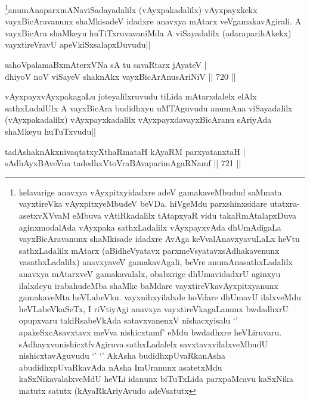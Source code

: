 \begin{artha}
\footnote{kelavarige anavxya vAyxpitxyidadxre adeV gamakaveMbudud  saMmata vayxtireVka vAyxpitxyeMbudeV beVDa. hiVgeMdu parxshinxsidare utatxra-asetxvXVvaM eMbuva vAtiRkadalilx tAtapxyaR vidu takaRmAtalapxDuva aginxmodalAda vAyxpaka sathxLadalilx vAyxpayxvAda dhUmAdigaLa vayxBicAravanunx shaMkisade idadxre AvAga keVvalAnavxyavuLaLx heVtu sathxLadalilx mAtarx (aBidheVyatavx parxmeVsyatavxsAdhakavenunx vasathxLadalilx) anavxyaveV gamakavAgali, beVre anumAnasathxLadalilx anavxya mAtarxveV gamakavalalx, obabxrige dhUmavidadxrU aginxyu ilalxdeyu irabahudeMba shaMke baMdare vayxtireVkavAyxpitxyanunx gamakaveMta heVLabeVku. vayxnihxyilalxde hoVdare dhUmavU ilalxveMdu heVLabeVkaSeTx, I riVtiyAgi anavxya vayxtireVkagaLanunx bwdadhxrU opupxvaru takiRsabeVkAda satavxvanenxV nishacxyisalu `\stext' apakeSxcAsavxtavx meVva nishicxtamf' eMdu bwdadhxre heVLiruvaru. sAdhayxvunishicxtfvAgiruva sathxLadalelx savxtavxvilalxveMbudU nishicxtavAguvudu `\stext' `\stext' AkAsha budidhxpUvaRkanAsha abudidhxpUvaRkavAda nAsha ImUranunx asatetxMdu kaSxNikavalalxveMdU heVLi idanunx biTuTxLida parxpaMcavu kaSxNika matutx satutx (kAyaRkAriyAvudo adeVsatutx}anumAnaparxmANaviSadayadalilx (vAyxpakadalilx) vAyxpayxkekx vayxBicAravanunx shaMkisadeV idadxre anavxya mAtarx veVgamakavAgirali. A vayxBicAra shaMkeyu huTiTxruvavaniMda A viSayadalilx (adaraparihAkekx) vayxtireVravU apeVkiSxsalapxDuvudu||
\end{artha}


\begin{shl}
sahoVpalamaBxmAterxVNa sA tu savaRtarx jAyateV | \\
dhiyoV noV viSayeV shaknAkx vayxBicArAnusAriNiV \hfill||  720 ||  
\end{shl}

\begin{artha}
vAyxpayxvAyxpakagaLu joteyalilxruvudu tiLida mAtarxdalelx elAlx sathxLadalUlx A vayxBicAra budidhxyu uMTAguvudu anumAna viSayadalilx (vAyxpakadalilx) vAyxpayxkadalilx vAyxpayxdavayxBicAranu sAriyAda shaMkeyu huTuTxvudu||
\end{artha}

\begin{shl}
tadAshaknAkxnivaqtatxyXthaRmataH kAyaRM parxyatanxtaH | \\
sAdhAyxBAveVna tadedhxVtoVraBAvaparimAgaRNamf \hfill||  721 ||  
\end{shl}

